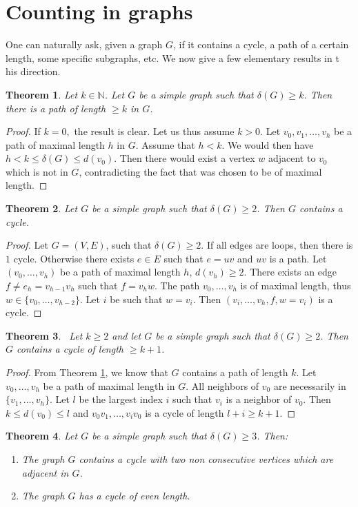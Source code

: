 \documentclass[12pt,a4paper]{article}
\newtheorem{thm}{Theorem}[section]
\theoremstyle{definition}
\begin{document}
\section{Counting in graphs}
One can naturally ask,  given a graph $G$, if it contains a cycle, a path of a certain length, some specific subgraphs, etc. We now give a few elementary results in t his direction. 
\begin{thm}\label{thma} Let $k \in \mathbb{N}$. Let $G$ be a simple graph such that $\delta(G) \geq k$. Then there is a path of length $\geq k$ in $G$. 
\end{thm}
\begin{proof}
If $k=0,$ the result is clear. Let us thus assume $k>0$. Let $v_0, v_1, \dots , v_h$ be a path of maximal length $h$ in $G$. Assume that $h <k$. We would then have $h<k \leq \delta(G) \leq d(v_0)$. Then there would exist a vertex $w$  adjacent to $v_0$ which is not in $G$, contradicting the fact that was chosen to be of maximal length. 
\end{proof}
\begin{thm}\label{thmb} Let $G$ be a simple graph such that $\delta(G) \geq 2$. Then $G$ contains a cycle. 
\end{thm}
\begin{proof}
Let $G=(V,E)$, such that $\delta(G) \geq 2$. If all edges are loops, then there is $1$ cycle. Otherwise there exists $e \in E$ such that $e= uv$ and $uv$ is a path. Let $(v_0, \dots , v_h)$ be a path of maximal length $h$, $d(v_h) \geq 2$. There exists an edge $f \neq e_h = v_{h-1}v_h$ such that $f= v_hw$. The path $v_0, \dots , v_h$ is of maximal length, thus $w \in \{v_0, \dots , v_{h-2}\}$. Let $i$ be such that $w= v_i$. Then $(v_i, \dots , v_h, f, w = v_i)$ is a cycle. 
\end{proof}
\begin{thm}\ Let $k \geq 2$ and let $G$ be a simple graph such that $\delta(G) \geq 2$. Then $G$ contains a cycle of length $\geq k+1$.
\end{thm}
\begin{proof}
From Theorem \ref{thma}, we know that $G$ contains a path of length $k$. Let $v_0, \dots , v_h$ be a path of maximal length in $G$. All neighbors of $v_0$ are necessarily in $\{v_1, \dots ,  v_h\}.$ Let $l$ be the largest index $i$ such that $v_i$ is a neighbor of $v_0$. Then $k \leq d(v_0) \leq l$ and $v_0v_1, \dots , v_iv_0$ is a cycle of length $l+i \geq k+1$. 
\end{proof}
\begin{thm} Let $G$ be a simple graph such that $\delta(G) \geq 3$. Then:
\begin{enumerate}
\item The graph $G$ contains a cycle with two non consecutive vertices which are adjacent in $G$. 
\item The graph $G$ has a cycle of even length. 
\end{enumerate}
\end{thm}
\end{document}
